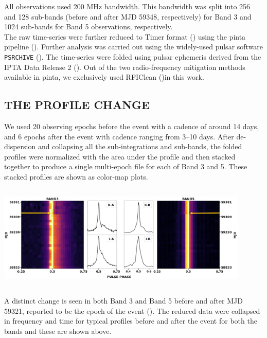 \documentclass{article}
\begin{document}
All observations used 200 MHz bandwidth. This bandwidth was split into 256 and 128 sub-bands (before and after MJD 59348, respectively) for Band 3 and 1024 sub-bands for Band 5 observations, respectively.\\

The raw time-series were further reduced to Timer format (\cite{vanStratenBailes2011}) using the pinta pipeline (\cite{Susobhanan+2021}). Further analysis was carried out using the widely-used pulsar software {\tt PSRCHIVE} (\cite{Hotan+2004}). The time-series were folded using pulsar ephemeris derived from the IPTA Data Release 2 (\cite{Perera+2019}). Out of the two radio-frequency mitigation methods available in pinta, we exclusively used RFIClean (\cite{Maan+2020})in this work.

\clearpage
\newpage
\subsection{THE PROFILE CHANGE}
We used 20 observing epochs before the event with a cadence of around 14 days, and 6 epochs after the event with cadence ranging from 3–10 days. After de-dispersion and collapsing all the sub-integrations and sub-bands, the folded profiles were normalized with the area under the profile and then stacked together to produce a single multi-epoch file for each of Band 3 and 5. These stacked profiles are shown as color-map plots. 

\begin{center}
\includegraphics[height=5cm,width=12cm]{Images/Pulsar12.png}\\
\end{center}
A distinct change is seen in both Band 3 and Band 5 before and after MJD 59321, reported to be the epoch of the event (\cite{Meyers+2021}). The reduced data were collapsed in frequency and time for typical profiles before and after the event for both the bands and these are shown above. 
\end{document}
